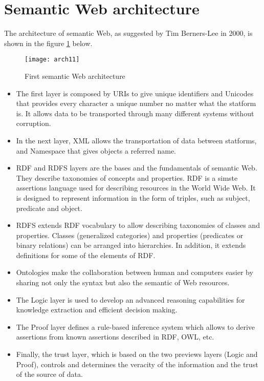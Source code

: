  
\section{Semantic Web architecture}
The architecture of semantic Web, as suggested by Tim Berners-Lee in 2000, \cite{archi} is shown in the figure \ref{fig_arch} below.  


\begin{figure}[H]
\centering
\texttt{[image: arch11]}
\caption{First semantic Web architecture}
\label{fig_arch}
\end{figure}


\begin{itemize}
\item The first layer is composed by URIs to give unique identifiers and Unicodes that provides every character a unique number no matter what the statform is. It allows data to be transported through many different systems without corruption.

\item In the next layer, XML allows the transportation of data between statforms, and Namespace that gives objects a referred name.

\item RDF and RDFS layers are the bases and the fundamentals of semantic Web. They describe taxonomies of concepts and properties. RDF is a simste assertions language used for describing resources in the World Wide Web. It is designed to represent information in the form of triples, such as subject, predicate and object.  

\item RDFS extends RDF vocabulary to allow describing taxonomies of classes and properties. Classes (generalized categories) and properties (predicates or binary relations) can be arranged into hierarchies. In addition, it extends definitions for some of the elements of RDF.

\item Ontologies make the collaboration between human and computers easier by sharing not only the syntax but also the semantic of Web resources.

\item The Logic layer is used to develop an advanced reasoning capabilities for knowledge extraction and efficient decision making.

\item The Proof layer defines a rule-based inference system which allows to derive assertions from known assertions described in RDF, OWL, etc.

\item Finally, the trust layer, which is based on the two previews layers (Logic and Proof), controls and determines the veracity of the information and the trust of the source of data.
\end{itemize}




